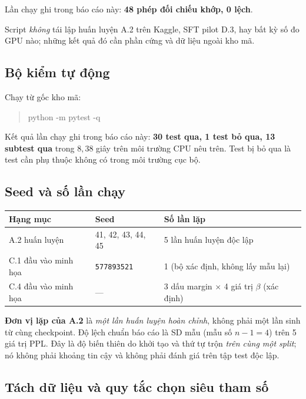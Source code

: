 Lần chạy ghi trong báo cáo này: \textbf{48 phép đối chiếu khớp, 0 lệch}.

Script \emph{không} tái lập huấn luyện A.2 trên Kaggle, SFT pilot D.3, hay bất kỳ
số đo GPU nào; những kết quả đó cần phần cứng và dữ liệu ngoài kho mã.

\subsection{Bộ kiểm tự động \dalam}

Chạy từ gốc kho mã:

\begin{quote}\small\ttfamily
python -m pytest -q
\end{quote}

Kết quả lần chạy ghi trong báo cáo này: \textbf{30 test qua, 1 test bỏ qua, 13
subtest qua} trong $8{,}38$ giây trên môi trường CPU nêu trên. Test bị bỏ qua là
test cần phụ thuộc không có trong môi trường cục bộ.

\subsection{Seed và số lần chạy}

\begin{center}
\begin{tabular}{lll}
\toprule
\textbf{Hạng mục} & \textbf{Seed} & \textbf{Số lần lặp}\\
\midrule
A.2 huấn luyện & 41, 42, 43, 44, 45 & 5 lần huấn luyện độc lập\\
C.1 đầu vào minh họa & \texttt{577893521} & 1 (bộ xác định, không lấy mẫu lại)\\
C.4 đầu vào minh họa & --- & 3 dấu margin $\times$ 4 giá trị $\beta$ (xác định)\\
\bottomrule
\end{tabular}
\end{center}

\textbf{Đơn vị lặp của A.2} là \emph{một lần huấn luyện hoàn chỉnh}, không phải một
lần sinh từ cùng checkpoint. Độ lệch chuẩn báo cáo là SD mẫu (mẫu số $n-1=4$) trên
5 giá trị PPL. Đây là độ biến thiên do khởi tạo và thứ tự trộn \emph{trên cùng một
split}; nó không phải khoảng tin cậy và không phải đánh giá trên tập test độc lập.

\subsection{Tách dữ liệu và quy tắc chọn siêu tham số}

